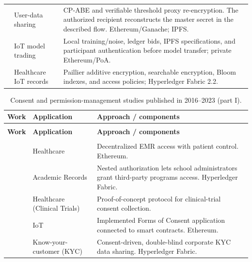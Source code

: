 \begin{longtable}{@{}>{\raggedright\arraybackslash}m{}>{\raggedright\arraybackslash}m{}>{\raggedright\arraybackslash}m{}@{}}
\addlinespace[5pt]
\cite{updateRen2024DistributedKMS} & User-data sharing & CP-ABE and verifiable threshold proxy re-encryption. The authorized recipient reconstructs the master secret in the described flow. Ethereum/Ganache; IPFS. \\
\addlinespace[5pt]
\cite{updateHussain2025ZeroTrust} & IoT model trading & Local training/noise, ledger bids, IPFS specifications, and participant authentication before model transfer; private Ethereum/PoA. \\
\addlinespace[5pt]
\cite{updateGuan2025Healthcare} & Healthcare IoT records & Paillier additive encryption, searchable encryption, Bloom indexes, and access policies; Hyperledger Fabric 2.2. \\
\end{longtable}

\begin{longtable}{@{}>{\raggedright\arraybackslash}m{}>{\raggedright\arraybackslash}m{}>{\raggedright\arraybackslash}m{}@{}}
\caption{Consent and permission-management studies published in 2016--2023 (part I).}\label{tab:consent-works} \\
\toprule
\textbf{Work} & \textbf{Application} & \textbf{Approach / components} \\
\midrule
\endfirsthead
\multicolumn{3}{l}{\tablename\ \thetable\ (continued)} \\
\toprule
\textbf{Work} & \textbf{Application} & \textbf{Approach / components} \\
\midrule
\endhead
\multicolumn{3}{r}{Continued on the next page} \\
\endfoot
\bottomrule
\endlastfoot
\cite{2016-medrec} & Healthcare & Decentralized EMR access with patient control. Ethereum. \\
\addlinespace[5pt]
\cite{10.1109/ICCCI.2018.8441445} & Academic Records & Nested authorization lets school administrators grant third-party programs access. Hyperledger Fabric. \\
\addlinespace[5pt]
\cite{2017-clinical-trials} & Healthcare (Clinical Trials) & Proof-of-concept protocol for clinical-trial consent collection. \\
\addlinespace[5pt]
\cite{10.1109/INISTA.2018.8466268} & IoT & Implemented Forms of Consent application connected to smart contracts. Ethereum. \\
\addlinespace[5pt]
\cite{2018-double-blind} & Know-your-customer (KYC) & Consent-driven, double-blind corporate KYC data sharing. Hyperledger Fabric. \\

\end{longtable}

